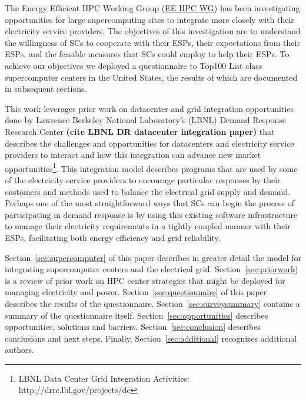 The Energy Efficient HPC Working Group (\href {http://eehpcwg.lbl.gov/}{EE HPC WG})  
has been investigating opportunities for large supercomputing sites to  
integrate more closely with their electricity service providers.
The objectives of this investigation are to understand the willingness of SCs to
cooperate with their ESPs, their expectations from their ESPs, and the feasible measures
that SCs could employ to help their ESPs.
To achieve our objectives we deployed a questionnaire to
Top100 List class supercomputer centers in the United States, the results of
which are documented in subsequent sections.

This work leverages prior work on datacenter and grid integration opportunities
done by Lawrence Berkeley National Laboratory's (LBNL) Demand Response 
Research Center \textbf{(cite LBNL DR datacenter integration paper)}
that describes the challenges and opportunities for datacenters and electricity
service providers to interact and how this integration can advance 
new market 
opportunities\footnote{LBNL Data Center Grid Integration Activities: http://drrc.lbl.gov/projects/dc}.
This integration model describes programs that are used by some of the electricity 
service providers to encourage particular responses by their customers and methods 
used to balance the electrical grid supply and demand.
Perhaps one of the most straightforward ways that SCs can begin
the process of participating in demand response is by using this existing software 
infrastructure to manage their electricity requirements in a tightly coupled manner 
with their ESPs, facilitating both energy efficiency and grid reliability.

Section~\ref{sec:supercomputer}  of this paper describes in greater detail the model for
integrating supercomputer centers and the electrical grid. Section~\ref{sec:priorwork}
is a review of prior work on HPC center strategies that might be
deployed for managing electricity and power. Section~\ref{sec:questionnaire} of this paper
describes the results of the questionnaire. Section~\ref{sec:surveysummary}
contains a summary of the questionnaire itself. Section~\ref{sec:opportunities} 
describes opportunities, solutions and barriers. Section~\ref{sec:conclusion} describes
conclusions and next steps. Finally, Section~\ref{sec:additional} recognizes additional
authors.

